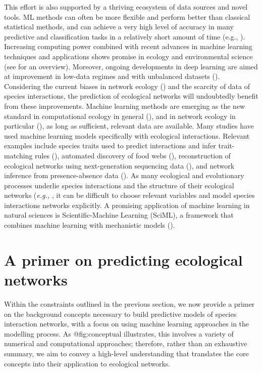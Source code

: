 \begin{refsection}
This effort is also supported by a thriving ecosystem of data sources
and novel tools. ML methods can often be more flexible and perform
better than classical statistical methods, and can achieve a very high
level of accuracy in many predictive and classification tasks in a
relatively short amount of time (e.g., \cite{Cutler2007RanFor,
Krizhevsky2017ImaCla}). Increasing computing power combined with
recent advances in machine learning techniques and applications shows
promise in ecology and environmental science (see \cite{Christin2019AppDee}
for an overview). Moreover, ongoing developments in deep learning are
aimed at improvement in low-data regimes and with unbalanced datasets
(\cite{Antoniou2018DatAug, Chawla2010DatMin}). Considering the current
biases in network ecology (\cite{Poisot2021GloKno}) and the scarcity of
data of species interactions, the prediction of ecological networks will
undoubtedly benefit from these improvements. Machine learning methods
are emerging as the new standard in computational ecology in general
(\cite{Olden2008MacLea, Christin2019AppDee}), and in network ecology in
particular (\cite{Bohan2017NexGlo}), as long as sufficient, relevant data
are available. Many studies have used machine learning models
specifically with ecological interactions. Relevant examples include
species traits used to predict interactions and infer trait-matching
rules (\cite{Desjardins-Proulx2017EcoInt, Pichler2020Machine}), automated
discovery of food webs (\cite{Bohan2011AutDis}), reconstruction of
ecological networks using next-generation sequencing data
(\cite{Bohan2017NexGlo}), and network inference from presence-absence data
(\cite{Sander2017EcoNet}). As many ecological and evolutionary processes
underlie species interactions and the structure of their ecological
networks (\emph{e.g.,} \cite{Vazquez2009UniPat, Segar2020RolEvo}, it can be
difficult to choose relevant variables and model species interactions
networks explicitly. A promising application of machine learning in
natural sciences is Scientific-Machine Learning (SciML), a framework
that combines machine learning with mechanistic models
(\cite{Chuang2018AdvCon, Rackauckas2020UniDif}).

\section{A primer on predicting ecological
networks}\label{a-primer-on-predicting-ecological-networks}

Within the constraints outlined in the previous section, we now provide
a primer on the background concepts necessary to build predictive models
of species interaction networks, with a focus on using machine learning
approaches in the modelling process. As @fig:conceptual illustrates,
this involves a variety of numerical and computational approaches;
therefore, rather than an exhaustive summary, we aim to convey a
high-level understanding that translates the core concepts into their
application to ecological networks.


\end{refsection}
